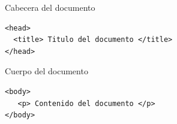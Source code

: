 \documentclass{beamer}
\begin{document}
\begin{frame}[fragile]{Cabecera del documento} %
    \begin{center}
        \begin{lstlisting}
<head>
  <title> Titulo del documento </title>
</head>
        \end{lstlisting}
    \end{center}
\end{frame}

\begin{frame}[fragile]{Cuerpo del documento} %
    \begin{center}
        \begin{lstlisting}
<body>
   <p> Contenido del documento </p>
</body>
        \end{lstlisting}
    \end{center}
\end{frame}
\end{document}
